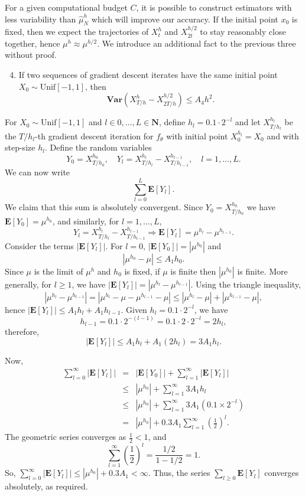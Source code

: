 \documentclass{article}
\begin{document}
For a given computational budget \(C\), it is possible to construct estimators with less variability than \(\hat\mu^h_N\) which will improve our accuracy. If the initial point \(x_0\) is fixed, then we expect the trajectories of \(X^h_t\) and \(X^{h/2}_{2t}\) to stay reasonably close together, hence \(\mu^h \approx \mu^{h/2}\). We introduce an additional fact to the previous three without proof.
\begin{enumerate}\setcounter{enumi}{3}
    \item If two sequences of gradient descent iterates have the same initial point \(X_0 \sim \mathrm{Unif}[-1, 1]\), then
    \[ \mathbf{Var}(X^h_{T/h} - X^{h/2}_{2T/h}) \leq A_4h^2.  \]
\end{enumerate}
For \(X_0 \sim \mathrm{Unif}[-1, 1]\) and \(l \in 0, \dots, L \in \mathbf{N}\), define \(h_l = 0.1 \cdot 2^{-l}\) and let \(X^{h_l}_{T/h_l}\) be the \(T/h_l\)-th gradient descent iteration for \(f_\theta\) with initial point \(X_0^{h_l} = X_0\) and with step-size \(h_l\). Define the random variables
\[ Y_0 = X^{h_0}_{T/h_0}, \quad Y_l = X^{h_l}_{T/h_l} - X^{h_{l-1}}_{T/h_{l-1}}, \quad l = 1, \dots, L. \]
We can now write
\[ \sum_{l = 0}^L \mathbf{E}[Y_l]. \]
We claim that this sum is absolutely convergent. Since \(Y_0 = X^{h_0}_{T/h_0}\) we have \(\mathbf{E}[Y_0] = \mu^{h_0}\), and similarly, for \(l = 1, \dots, L\), 
\[  Y_l = X^{h_l}_{T/h_l} - X^{h_{l-1}}_{T/h_{l-1}}  \Rightarrow \mathbf{E}[Y_l] = \mu^{h_l} - \mu^{h_{l-1}}. \]
Consider the terms \(|\mathbf{E}[Y_l]|\). For \(l=0\), \(|\mathbf{E}[Y_0]| = |\mu^{h_0}|\) and 
\[ |\mu^{h_0} - \mu| \leq A_1 h_0. \]
Since \(\mu\) is the limit of \(\mu^h\) and \(h_0\) is fixed, if \(\mu\) is finite then \(|\mu^{h_0}|\) is finite. More generally, for \(l \geq 1\), we have \(|\mathbf{E}[Y_l]| = |\mu^{h_l} - \mu^{h_{l-1}}|\). Using the triangle inequality, 
\[ |\mu^{h_l} - \mu^{h_{l-1}}| = |\mu^{h_l} - \mu - \mu^{h_{l-1}} - \mu| \leq |\mu^{h_l} - \mu| + |\mu^{h_{l-1}} - \mu|, \]
hence \(|\mathbf{E}[Y_l]| \leq A_1 h_l + A_1 h_{l-1}\). Given \(h_l = 0.1 \cdot 2^{-l}\), we have 
\[ h_{l-1} = 0.1 \cdot 2^{-(l-1)} = 0.1 \cdot 2 \cdot 2^{-l} = 2h_l, \]
therefore,
\[ |\mathbf{E}[Y_l]| \leq A_1 h_l + A_1 (2h_l) = 3A_1 h_l. \]

Now,
\begin{eqnarray*} 
    \sum_{l=0}^\infty |\mathbf{E}[Y_l]| & = & |\mathbf{E}[Y_0]| + \sum_{l=1}^\infty |\mathbf{E}[Y_l]| \\ 
                                        & \leq & |\mu^{h_0}| + \sum_{l=1}^\infty 3A_1 h_l \\
                                        & \leq & |\mu^{h_0}| + \sum_{l=1}^\infty 3A_1 (0.1 \times 2^{-l}) \\
                                        & = & |\mu^{h_0}| + 0.3 A_1 \sum_{l=1}^\infty \left(\frac{1}{2}\right)^l. 
\end{eqnarray*}
The geometric series converges as \(\frac{1}{2} < 1\), and 
\[ \sum_{l=1}^\infty \left(\frac{1}{2}\right)^l = \frac{1/2}{1 - 1/2} = 1. \]
So, \(\sum_{l=0}^\infty |\mathbf{E}[Y_l]| \leq |\mu^{h_0}| + 0.3 A_1 < \infty\). Thus, the series \(\sum_{l \ge 0} \mathbf{E}[Y_l]\) converges absolutely, as required.
\end{document}
